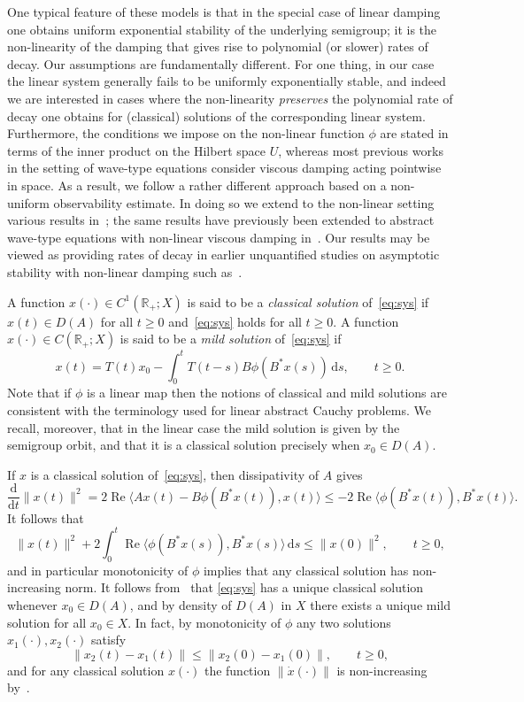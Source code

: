 \documentclass[11pt, a4paper]{amsart}
\DeclareMathOperator*{\R}{Re}
\newcommand{\dd}{\mathrm{d}}
\newcommand{\RR}{\mathbb{R}}
\theoremstyle{definition}
\numberwithin{equation}{section}
\begin{document}
One typical feature of these models is that in the special case of linear damping one obtains uniform exponential stability of the underlying semigroup; it is the non-linearity of the damping that gives rise to polynomial (or slower) rates of decay. Our assumptions are fundamentally different. For one thing, in our case the linear system generally fails to be uniformly exponentially stable, and indeed we are interested in cases where the non-linearity \emph{preserves} the polynomial rate of decay one obtains for (classical) solutions of the corresponding linear system. 
 Furthermore, the conditions we impose on the non-linear function $\phi$ are stated in terms of the inner product on the Hilbert space $U$, whereas most previous works in the setting of wave-type equations consider viscous damping acting pointwise in space. As a result, we follow a rather different approach  based on a non-uniform observability estimate.  In doing so we extend to the non-linear setting various results in~\cite{AmmTuc01}; the same results have  previously been extended to abstract wave-type equations with non-linear viscous damping in~\cite{AlaAmm11,AmmBch16,AmmBch17,Phu11}. 
Our results  may be viewed as  providing rates of decay in earlier unquantified studies on asymptotic stability with non-linear damping
such as~\cite{CurOos01, CurZwa16, LasSei03,MarAnd17,Sle89}. 

A function $x(\cdot)\in C^1(\RR_+;X)$ is said to be a  \emph{classical solution} of~\eqref{eq:sys} if  $x(t)\in D(A)$ for all $t\ge 0$ and~\eqref{eq:sys} holds for all $t\geq 0$. 
A function $x(\cdot)\in C(\RR_+;X)$ is said to be a \emph{mild solution} of~\eqref{eq:sys} if 
$$x(t)=T(t)x_0-\int_0^tT(t-s)B\phi(B^*x(s))\,\dd s,\qquad t\ge0.$$
Note that if $\phi$ is a linear map then the notions of classical and mild solutions are consistent with the terminology used for linear abstract Cauchy problems. We recall, moreover, that in the linear case the mild solution is given by the semigroup orbit, and that it is a classical solution precisely when $x_0\in D(A)$. 

If $x$ is a  classical solution of~\eqref{eq:sys}, then dissipativity of $A$ gives
$$
\frac{\dd}{\dd t}\|x(t)\|^2
 = 2\R \langle A x(t) - B\phi(B^\ast x(t)),x(t)\rangle\leq -2\R \langle \phi(B^\ast x(t)),B^\ast x(t)\rangle.
$$
It follows that
\begin{equation}\label{eq:energy_balance}
\|x(t)\|^2 + 2\int_0^t \R \langle \phi(B^\ast x(s)),B^\ast x(s)\rangle\,\dd s 
\le \|x(0)\|^2, \qquad t\ge 0,
\end{equation}
and in particular monotonicity of $\phi$ implies that any classical solution has non-increasing norm. It follows from~\cite[Thm.~11.1.5(b)]{CurZwa20book} that \eqref{eq:sys} has a unique classical solution whenever $x_0\in D(A)$, and by density of $D(A)$ in $X$ there exists a unique mild solution for all $x_0\in X$. In fact, by monotonicity of $\phi$ any two solutions $x_1(\cdot),x_2(\cdot)$ satisfy
\begin{equation}\label{eq:monotone}
\|x_2(t)-x_1(t)\|\le \|x_2(0)-x_1(0)\|, \qquad t\geq 0,
\end{equation}
and for any classical solution $x(\cdot)$ the function $\|\dot x(\cdot)\|$ is non-increasing by~\cite[Cor.~3.7]{Miy92book}.
\end{document}
